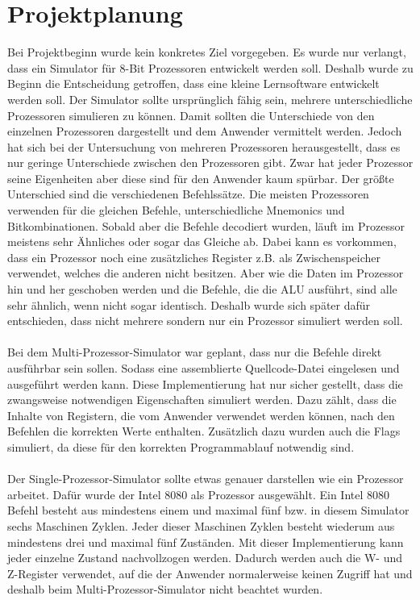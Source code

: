 \documentclass[12pt]{article}
\begin{document}
\section{Projektplanung}
Bei Projektbeginn wurde kein konkretes Ziel vorgegeben. Es wurde nur verlangt, dass ein Simulator für 8-Bit Prozessoren entwickelt werden soll. Deshalb wurde zu Beginn die Entscheidung getroffen, dass eine kleine Lernsoftware entwickelt werden soll. Der Simulator sollte ursprünglich fähig sein, mehrere unterschiedliche Prozessoren simulieren zu können. Damit sollten die Unterschiede von den einzelnen Prozessoren dargestellt und dem Anwender vermittelt werden. Jedoch hat sich bei der Untersuchung von mehreren Prozessoren herausgestellt, dass es nur geringe Unterschiede zwischen den Prozessoren gibt. Zwar hat jeder Prozessor seine Eigenheiten aber diese sind für den Anwender kaum spürbar. Der größte Unterschied sind die verschiedenen Befehlssätze. Die meisten Prozessoren verwenden für die gleichen Befehle, unterschiedliche Mnemonics und Bitkombinationen. Sobald aber die Befehle decodiert wurden, läuft im Prozessor meistens sehr Ähnliches oder sogar das Gleiche ab. Dabei kann es vorkommen, dass ein Prozessor noch eine zusätzliches Register z.B. als Zwischenspeicher verwendet, welches die anderen nicht besitzen. Aber wie die Daten im Prozessor hin und her geschoben werden und die Befehle, die die ALU ausführt, sind alle sehr ähnlich, wenn nicht sogar identisch. Deshalb wurde sich später dafür entschieden, dass nicht mehrere sondern nur ein Prozessor simuliert werden soll.
\\\\
Bei dem Multi-Prozessor-Simulator war geplant, dass nur die Befehle direkt ausführbar sein sollen. Sodass eine assemblierte Quellcode-Datei eingelesen und ausgeführt werden kann. Diese Implementierung hat nur sicher gestellt, dass die zwangsweise notwendigen Eigenschaften simuliert werden. Dazu zählt, dass die Inhalte von Registern, die vom Anwender verwendet werden können, nach den Befehlen die korrekten Werte enthalten. Zusätzlich dazu wurden auch die Flags simuliert, da diese für den korrekten Programmablauf notwendig sind. 
\\\\
Der Single-Prozessor-Simulator sollte etwas genauer darstellen wie ein Prozessor arbeitet. Dafür wurde der Intel 8080 als Prozessor ausgewählt. Ein Intel 8080 Befehl besteht aus mindestens einem und maximal fünf bzw. in diesem Simulator sechs Maschinen Zyklen. Jeder dieser Maschinen Zyklen besteht wiederum aus mindestens drei und maximal fünf Zuständen. Mit dieser Implementierung kann jeder einzelne Zustand nachvollzogen werden. Dadurch werden auch die W- und Z-Register verwendet, auf die der Anwender normalerweise keinen Zugriff hat und deshalb beim Multi-Prozessor-Simulator nicht beachtet wurden.
\end{document}
